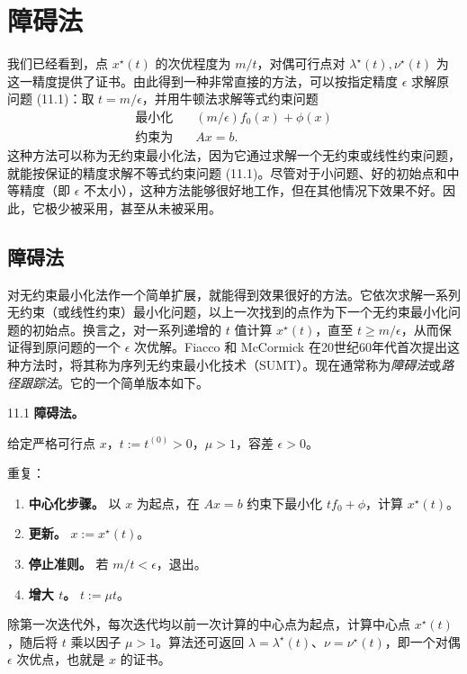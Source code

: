 \section{障碍法}
我们已经看到，点 $x^\star(t)$ 的次优程度为 $m/t$，对偶可行点对 $\lambda^\star(t),\nu^\star(t)$ 为这一精度提供了证书。由此得到一种非常直接的方法，可以按指定精度 $\epsilon$ 求解原问题 (11.1)：取 $t=m/\epsilon$，并用牛顿法求解等式约束问题
\[
\begin{aligned}
\text{最小化}\quad&(m/\epsilon)f_0(x)+\phi(x)\\
\text{约束为}\quad&Ax=b.
\end{aligned}
\]
这种方法可以称为无约束最小化法，因为它通过求解一个无约束或线性约束问题，就能按保证的精度求解不等式约束问题 (11.1)。尽管对于小问题、好的初始点和中等精度（即 $\epsilon$ 不太小），这种方法能够很好地工作，但在其他情况下效果不好。因此，它极少被采用，甚至从未被采用。

\subsection{障碍法}
对无约束最小化法作一个简单扩展，就能得到效果很好的方法。它依次求解一系列无约束（或线性约束）最小化问题，以上一次找到的点作为下一个无约束最小化问题的初始点。换言之，对一系列递增的 $t$ 值计算 $x^\star(t)$，直至 $t\ge m/\epsilon$，从而保证得到原问题的一个 $\epsilon$ 次优解。Fiacco 和 McCormick 在20世纪60年代首次提出这种方法时，将其称为序列无约束最小化技术（SUMT）。现在通常称为\emph{障碍法}或\emph{路径跟踪法}。它的一个简单版本如下。

\begin{origalgorithm}{11.1}
\textbf{障碍法。}

给定严格可行点 $x$，$t:=t^{(0)}>0$，$\mu>1$，容差 $\epsilon>0$。

重复：
\begin{enumerate}
\item \textbf{中心化步骤。} 以 $x$ 为起点，在 $Ax=b$ 约束下最小化 $tf_0+\phi$，计算 $x^\star(t)$。
\item \textbf{更新。} $x:=x^\star(t)$。
\item \textbf{停止准则。} 若 $m/t<\epsilon$，退出。
\item \textbf{增大 $t$。} $t:=\mu t$。
\end{enumerate}
\end{origalgorithm}
除第一次迭代外，每次迭代均以前一次计算的中心点为起点，计算中心点 $x^\star(t)$，随后将 $t$ 乘以因子 $\mu>1$。算法还可返回 $\lambda=\lambda^\star(t)$、$\nu=\nu^\star(t)$，即一个对偶 $\epsilon$ 次优点，也就是 $x$ 的证书。

